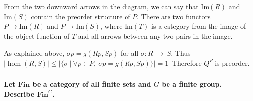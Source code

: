 \documentclass{article}
\begin{document}
From the two downward arrows in the diagram, we can say that $\mathrm{Im}(R)$ and $\mathrm{Im}(S)$ contain the preorder structure of $P$. There are two functors $P \rightarrow \mathrm{Im}(R)$ and $P \rightarrow \mathrm{Im}(S)$, where $\mathrm{Im}(T)$ is a category from the image of the object function of $T$ and all arrows between any two pairs in the image.

As explained above, $\sigma p = g(Rp, Sp)$ for all $\sigma : R\ \dot{\rightarrow}\ S$. Thus $|\hom(R, S)| \leq |\{\sigma\ |\ \forall p \in P,\ \sigma p = g(Rp, Sp)\}| = 1$. Therefore $Q^P$ is preorder.

\subsubsection{}

\textbf{Let $\mathbf{Fin}$ be a category of all finite sets and $G$ be a finite group. Describe $\mathbf{Fin}^G$.}



\subsection{}

\subsection{}

\subsection{}

\subsection{}

\section{}

\section{}

\section{}

\section{}
\end{document}
